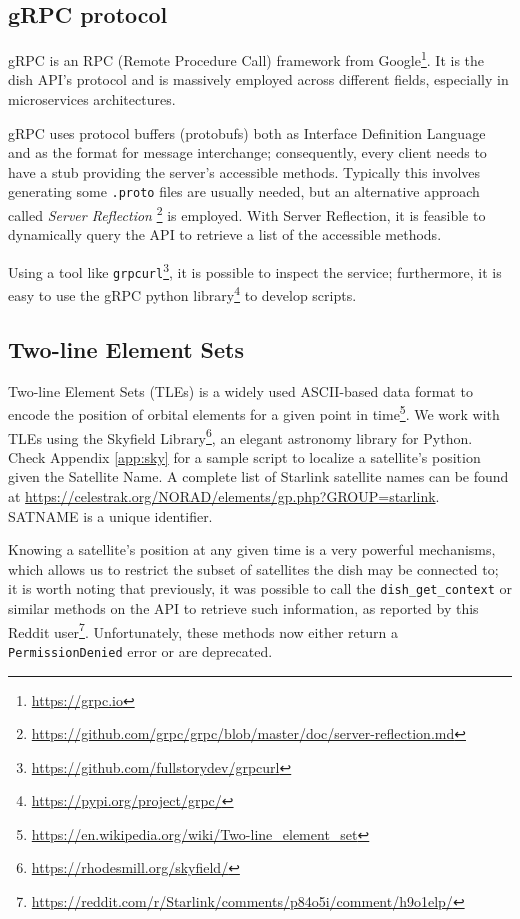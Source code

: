 \documentclass[IN,11pt,twoside,openright,idp,english]{tumthesis}
\begin{document}
\subsection{gRPC protocol}
    
gRPC is an RPC (Remote Procedure Call) framework from Google\footnote{\url{https://grpc.io}}. It is the dish API's
protocol and is massively employed across different fields, especially in microservices architectures. 
    
gRPC uses protocol buffers (protobufs) both as Interface Definition Language and as the format for message interchange;
consequently, every client needs to have a stub providing the server's accessible methods. Typically this involves
generating some \texttt{.proto} files are usually needed, but an alternative approach called \textit{Server Reflection}
\footnote{\url{https://github.com/grpc/grpc/blob/master/doc/server-reflection.md}} is employed. With Server Reflection,
it is feasible to dynamically query the API to retrieve a list of the accessible methods.

Using a tool like \texttt{grpcurl}\footnote{\url{https://github.com/fullstorydev/grpcurl}}, it is possible to inspect
the service; furthermore, it is easy to use the gRPC python library\footnote{\url{https://pypi.org/project/grpc/}} to
develop scripts.
    
\subsection{Two-line Element Sets}
    
Two-line Element Sets (TLEs) is a widely used ASCII-based data format to encode the position of orbital elements for a
given point in time\footnote{\url{https://en.wikipedia.org/wiki/Two-line_element_set}}. We work with TLEs using the
Skyfield Library\footnote{\url{https://rhodesmill.org/skyfield/}}, an elegant astronomy library for Python. Check
Appendix \ref{app:sky} for a sample script to localize a satellite's position given the Satellite Name. A complete list
of Starlink satellite names can be found at \url{https://celestrak.org/NORAD/elements/gp.php?GROUP=starlink}. 
SATNAME is a unique identifier.
    
Knowing a satellite's position at any given time is a very powerful mechanisms, which allows us to restrict the subset
of satellites the dish may be connected to; it is worth noting that previously, it was possible to call the
\texttt{dish\_get\_context} or similar methods on the API to retrieve such information, as reported by this Reddit
user\footnote{\url{https://reddit.com/r/Starlink/comments/p84o5i/comment/h9o1elp/}}. Unfortunately, these methods now
either return a \texttt{PermissionDenied} error or are deprecated.
    
\end{document}
